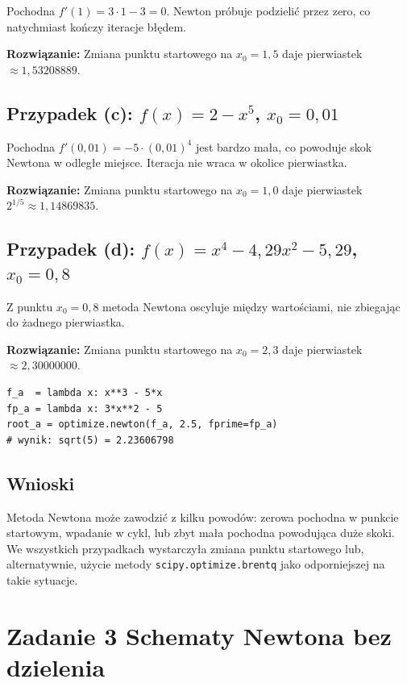\documentclass[12pt, a4paper]{article}
\begin{document}
 Pochodna $f'(1) = 3 \cdot 1 - 3 = 0$. Newton próbuje podzielić przez zero, co natychmiast kończy iteracje błędem.

\textbf{Rozwiązanie:} Zmiana punktu startowego na $x_0 = 1{,}5$ daje pierwiastek $\approx 1{,}53208889$.

\subsection{Przypadek (c): $f(x) = 2 - x^5$, $x_0 = 0{,}01$}

 Pochodna $f'(0{,}01) = -5 \cdot (0{,}01)^4$ jest bardzo mała, co powoduje skok Newtona w odległe miejsce. Iteracja nie wraca w okolice pierwiastka.

\textbf{Rozwiązanie:} Zmiana punktu startowego na $x_0 = 1{,}0$ daje pierwiastek $2^{1/5} \approx 1{,}14869835$.

\subsection{Przypadek (d): $f(x) = x^4 - 4{,}29x^2 - 5{,}29$, $x_0 = 0{,}8$}

 Z punktu $x_0 = 0{,}8$ metoda Newtona oscyluje między wartościami, nie zbiegając do żadnego pierwiastka.

\textbf{Rozwiązanie:} Zmiana punktu startowego na $x_0 = 2{,}3$ daje pierwiastek $\approx 2{,}30000000$.

\begin{lstlisting}[caption={Przykładowe naprawione wywołanie dla przypadku (a)}]
f_a  = lambda x: x**3 - 5*x
fp_a = lambda x: 3*x**2 - 5
root_a = optimize.newton(f_a, 2.5, fprime=fp_a)
# wynik: sqrt(5) = 2.23606798
\end{lstlisting}

\subsection{Wnioski}

Metoda Newtona może zawodzić z kilku powodów: zerowa pochodna w punkcie startowym, wpadanie w cykl, lub zbyt mała pochodna powodująca duże skoki. We wszystkich przypadkach wystarczyła zmiana punktu startowego lub, alternatywnie, użycie metody \texttt{scipy.optimize.brentq} jako odporniejszej na takie sytuacje.

\section{Zadanie 3 \textendash{} Schematy Newtona bez dzielenia}
\end{document}
